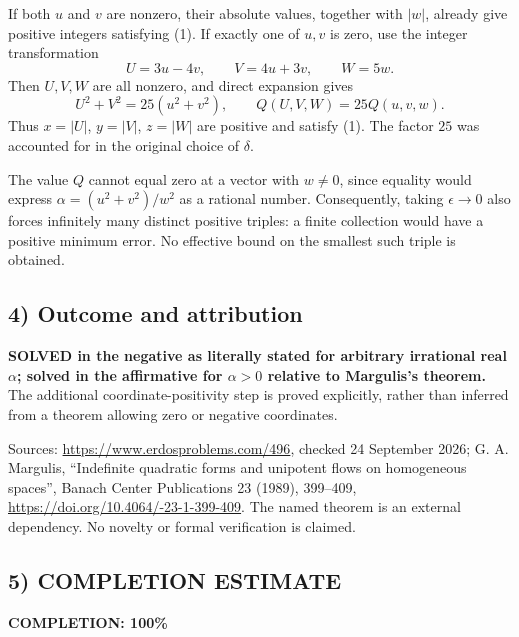 If both $u$ and $v$ are nonzero, their absolute values, together with $|w|$, already give positive integers satisfying (1). If exactly one of $u,v$ is zero, use the integer transformation
\[U=3u-4v,\qquad V=4u+3v,\qquad W=5w.
\]
Then $U,V,W$ are all nonzero, and direct expansion gives
\[U^2+V^2=25(u^2+v^2),\qquad Q(U,V,W)=25Q(u,v,w).
\]
Thus $x=|U|$, $y=|V|$, $z=|W|$ are positive and satisfy (1). The factor $25$ was accounted for in the original choice of $\delta$.

The value $Q$ cannot equal zero at a vector with $w\ne0$, since equality would express $\alpha=(u^2+v^2)/w^2$ as a rational number. Consequently, taking $\epsilon\to0$ also forces infinitely many distinct positive triples: a finite collection would have a positive minimum error. No effective bound on the smallest such triple is obtained.

\subsection*{4) Outcome and attribution}
\textbf{SOLVED in the negative as literally stated for arbitrary irrational real $\alpha$; solved in the affirmative for $\alpha>0$ relative to Margulis's theorem.} The additional coordinate-positivity step is proved explicitly, rather than inferred from a theorem allowing zero or negative coordinates.

Sources: \url{https://www.erdosproblems.com/496}, checked 24 September 2026; G. A. Margulis, ``Indefinite quadratic forms and unipotent flows on homogeneous spaces'', Banach Center Publications 23 (1989), 399--409, \url{https://doi.org/10.4064/-23-1-399-409}. The named theorem is an external dependency. No novelty or formal verification is claimed.

\subsection*{5) COMPLETION ESTIMATE}
\textbf{COMPLETION: 100\%}
